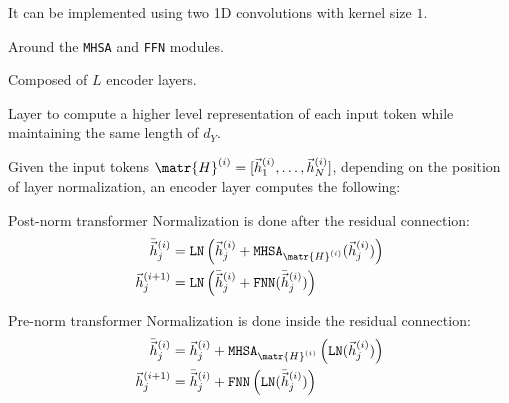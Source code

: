 \begin{description}
\begin{description}
                \begin{remark}
                    It can be implemented using two 1D convolutions with kernel size $1$.
                \end{remark}

            \item[Residual connection] 
                Around the \texttt{MHSA} and \texttt{FFN} modules.
        \end{description}


    \item[Encoder stack] 
        Composed of $L$ encoder layers.

    \item[Encoder layer] 
        Layer to compute a higher level representation of each input token while maintaining the same length of $d_Y$. 
        
        Given the input tokens $\matr{H}^{(i)} = [ \vec{h}^{(i)}_1, \dots, \vec{h}^{(i)}_N ]$, depending on the position of layer normalization, an encoder layer computes the following:
        \begin{descriptionlist}
            \item[Post-norm transformer] Normalization is done after the residual connection:
                \[
                    \begin{split}
                        \bar{\vec{h}}^{(i)}_j &= \texttt{LN}\left( \vec{h}^{(i)}_j + \texttt{MHSA}_{\matr{H}^{(i)}}(\vec{h}^{(i)}_j) \right) \\
                        \vec{h}^{(i+1)}_j &= \texttt{LN}\left( \bar{\vec{h}}^{(i)}_j + \texttt{FNN}(\bar{\vec{h}}^{(i)}_j) \right) \\
                    \end{split}
                \]

            \item[Pre-norm transformer] Normalization is done inside the residual connection:
                \[
                    \begin{split}
                        \bar{\vec{h}}^{(i)}_j &= \vec{h}^{(i)}_j + \texttt{MHSA}_{\matr{H}^{(i)}}\left( \texttt{LN}(\vec{h}^{(i)}_j) \right) \\
                        \vec{h}^{(i+1)}_j &= \bar{\vec{h}}^{(i)}_j + \texttt{FNN}\left( \texttt{LN}(\bar{\vec{h}}^{(i)}_j) \right) \\
                    \end{split}
                \]


\end{descriptionlist}
\end{description}

